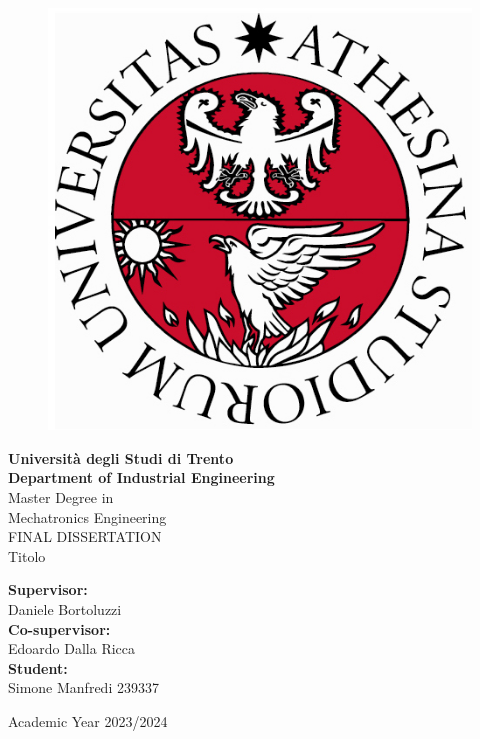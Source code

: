 \documentclass[a4paper,12pt,oneside]{report}
\begin{document}
\begin{titlepage}

\begin{figure}
\centering
\includegraphics[scale=0.25]{sigillo2}
\end{figure}

\begin{center}
\LARGE{\textbf{Università degli Studi di Trento\\ Department of Industrial Engineering}}\\
\vspace{10mm}
\Large{Master Degree in\\ Mechatronics Engineering}\\
\vspace{7mm}
\uppercase{Final Dissertation}
\vspace{7mm}\\
\huge{Titolo}
\end{center}

\vspace{8mm}
\begin{flushleft}
\large{\textbf{Supervisor:}\\ Daniele Bortoluzzi}\\
\vspace{5mm}
\large{\textbf{Co-supervisor:}\\ Edoardo Dalla Ricca}\\
\vspace{5mm}
\large{\textbf{Student:}\\ Simone Manfredi 239337}\\
\end{flushleft}

\vspace{15mm}
\begin{center}
\Large{Academic Year 2023/2024}
\end{center}

\end{titlepage}
\end{document}
